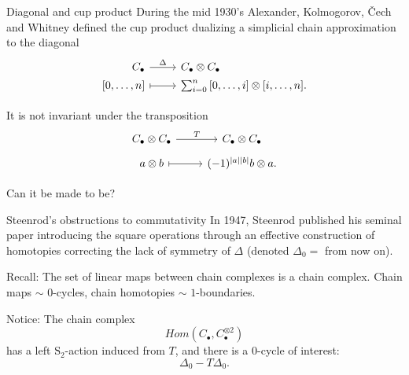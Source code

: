 \documentclass[10pt,t]{beamer}
\renewcommand{\S}{\mathrm{S}}
\begin{document}
\begin{frame}[fragile]{Diagonal and cup product}
	During the mid 1930's Alexander, Kolmogorov, \v{C}ech and Whitney defined the cup product dualizing a simplicial chain approximation to the diagonal
	\begin{equation*}
	\begin{tikzcd}[%
	,row sep = 0ex
	,/tikz/column 1/.append style={anchor=base east}
	,/tikz/column 2/.append style={anchor=base west}
	]
	C_\bullet \arrow[r, "\Delta"] & C_\bullet \otimes C_\bullet \\
	{[0, \dots, n]} \arrow[r, |->] & \sum_{i=0}^{n} {[0, \dots, i] \otimes [i, \dots, n]}.
	\end{tikzcd}
	\end{equation*}

	\pause \vspace*{10pt}

	It is not invariant under the transposition
	\begin{equation*}
	\begin{tikzcd}[row sep = tiny]
	C_\bullet \otimes C_\bullet \arrow[r, "T"] & C_\bullet \otimes C_\bullet \\
	a \otimes b \arrow[r, |->]& (-1)^{|a||b|} b \otimes a.
	\end{tikzcd}
	\end{equation*}
	
	\vspace*{10pt}\pause
	
	\textcolor{pblue}{Can it be made to be?}
	
	


\end{frame}


\begin{frame}{Steenrod's obstructions to commutativity}
	In 1947, Steenrod published his seminal paper introducing the square operations through an effective construction of homotopies correcting the lack of symmetry of $\Delta$ (denoted $\Delta_0 = $ from now on).

	\vspace*{15pt} \pause

	\textcolor{pblue}{Recall:} The set of linear maps between chain complexes is a chain complex.
	Chain maps $\sim$ $0$-cycles, chain homotopies $\sim$ $1$-boundaries.

	\vspace*{15pt}\pause

	\textcolor{pblue}{Notice:} The chain complex
	\begin{equation*} \label{eq: complex of maps to the tensor product}
	Hom\left(C_\bullet, C_\bullet^{\otimes 2}  \right)
	\end{equation*}
	has a left $\S_2$-action induced from $T$, and there is a $0$-cycle of interest:
	\begin{equation*}
	\Delta_0 - T \Delta_0.
	\end{equation*}
\end{frame}
\end{document}
